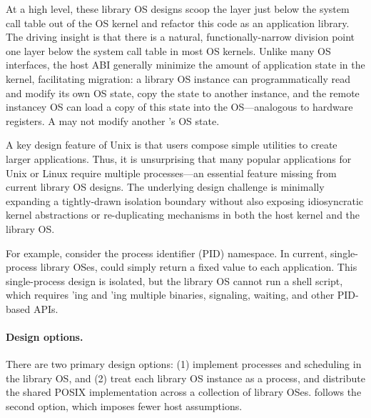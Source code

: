 At a high level, these library OS designs
scoop the layer just below the system call table out of the OS kernel
and refactor this code as an application library.  
The driving insight is that there is a natural, functionally-narrow division point 
one layer below the system call table
in most OS kernels.
Unlike many OS interfaces, the host ABI generally minimize the amount of application state in the kernel, facilitating
migration: a library OS instance can programmatically read and modify its own OS state, copy the state to another instance, and the remote instancey OS can 
load a copy of this state into the OS---analogous to hardware registers.
A \picoproc{} may not modify another \picoproc{}'s OS state.



\label{sec:overview:libos:multiproc}


A key design feature of Unix is that users compose simple utilities to create larger applications.  Thus, it is unsurprising that many popular applications for Unix or Linux require multiple processes---an essential feature missing from current library OS designs.
The underlying design challenge is minimally expanding a tightly-drawn isolation boundary without also exposing idiosyncratic kernel abstractions or re-duplicating mechanisms in both the host kernel and the library OS.


For example, consider the process identifier (PID) namespace. In current, single-process library OSes,  could simply return a fixed value to each application.
This single-process design is isolated, but the library OS cannot run a shell script, which requires 'ing and 'ing multiple binaries, signaling, waiting, and other PID-based APIs.

\paragraph{Design options.}
There are two primary design options: (1) implement processes and scheduling in 
the library OS, and (2) treat each library OS instance as a process, and distribute the shared POSIX implementation across a collection of library OSes.
\graphene{} follows the second option, which imposes fewer host assumptions.

